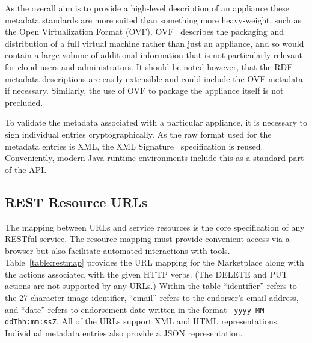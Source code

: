 As the overall aim is to provide a high-level description of an
appliance these metadata standards are more suited than something more
heavy-weight, such as the Open Virtualization Format
(OVF). OVF~\cite{ovf} describes the packaging and distribution of a
full virtual machine rather than just an appliance, and so would
contain a large volume of additional information that is not
particularly relevant for cloud users and administrators. It should be
noted however, that the RDF metadata descriptions are easily
extensible and could include the OVF metadata if necessary.
Similarly, the use of OVF to package the appliance itself is not
precluded.

To validate the metadata associated with a particular appliance, it is
necessary to sign individual entries cryptographically.  As the raw
format used for the metadata entries is XML, the XML
Signature~\cite{xmlsig} specification is reused.  Conveniently, modern
Java runtime environments include this as a standard part of the
API\@.

\subsection{REST Resource URLs}

The mapping between URLs and service resources is the core
specification of any RESTful service.  The resource mapping must
provide convenient access via a browser but also facilitate automated
interactions with tools.  Table~\ref{table:restmap} provides the URL
mapping for the Marketplace along with the actions associated with the
given HTTP verbs.  (The DELETE and PUT actions are not supported by
any URLs.)  Within the table ``identifier'' refers to the 27 character
image identifier, ``email'' refers to the endorser's email address,
and ``date'' refers to endorsement date written in the format {\tt
  yyyy-MM-ddThh:mm:ssZ}.  All of the URLs support XML and HTML
representations.  Individual metadata entries also provide a JSON
representation.

